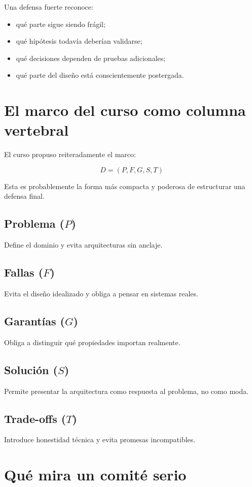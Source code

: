 \documentclass[variant=apuntes,cover=institutional,mode=screen]{ua-engineering-v6-article}
\begin{document}
Una defensa fuerte reconoce:
\begin{itemize}
\item qué parte sigue siendo frágil;
\item qué hipótesis todavía deberían validarse;
\item qué decisiones dependen de pruebas adicionales;
\item qué parte del diseño está conscientemente postergada.
\end{itemize}

\section{El marco del curso como columna vertebral}

El curso propuso reiteradamente el marco:

\[
D = (P, F, G, S, T)
\]

Esta es probablemente la forma más compacta y poderosa de estructurar una defensa final.

\subsection{Problema ($P$)}
Define el dominio y evita arquitecturas sin anclaje.

\subsection{Fallas ($F$)}
Evita el diseño idealizado y obliga a pensar en sistemas reales.

\subsection{Garantías ($G$)}
Obliga a distinguir qué propiedades importan realmente.

\subsection{Solución ($S$)}
Permite presentar la arquitectura como respuesta al problema, no como moda.

\subsection{Trade-offs ($T$)}
Introduce honestidad técnica y evita promesas incompatibles.

\section{Qué mira un comité serio}
\end{document}
